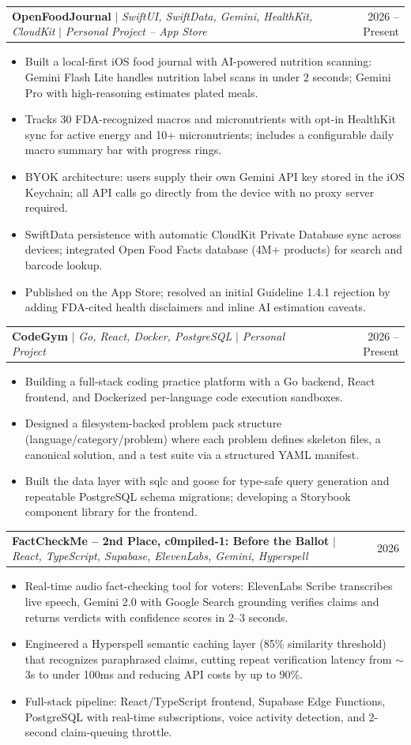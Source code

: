 \documentclass[letterpaper,11pt]{article}
\makeatletter
\newcommand{\resumeItem}[1]{
  \item\small{
    {#1 \vspace{-2pt}}
  }
}
\newcommand{\resumeProjectHeading}[2]{
    \item
    \begin{tabular*}{0.97\textwidth}{l@{\extracolsep{\fill}}r}
      \small#1 & #2 \\
    \end{tabular*}\vspace{-7pt}
}
\newcommand{\resumeItemListStart}{\begin{itemize}}
\newcommand{\resumeItemListEnd}{\end{itemize}\vspace{-5pt}}
\makeatother
\begin{document}
    \resumeProjectHeading
        {\textbf{OpenFoodJournal} $|$ \emph{SwiftUI, SwiftData, Gemini, HealthKit, CloudKit} $|$ \emph{Personal Project -- App Store}}{2026 -- Present}
        \resumeItemListStart
            \resumeItem{Built a local-first iOS food journal with AI-powered nutrition scanning: Gemini Flash Lite handles nutrition label scans in under 2 seconds; Gemini Pro with high-reasoning estimates plated meals.}
            \resumeItem{Tracks 30 FDA-recognized macros and micronutrients with opt-in HealthKit sync for active energy and 10+ micronutrients; includes a configurable daily macro summary bar with progress rings.}
            \resumeItem{BYOK architecture: users supply their own Gemini API key stored in the iOS Keychain; all API calls go directly from the device with no proxy server required.}
            \resumeItem{SwiftData persistence with automatic CloudKit Private Database sync across devices; integrated Open Food Facts database (4M+ products) for search and barcode lookup.}
            \resumeItem{Published on the App Store; resolved an initial Guideline 1.4.1 rejection by adding FDA-cited health disclaimers and inline AI estimation caveats.}
        \resumeItemListEnd

    \resumeProjectHeading
        {\textbf{CodeGym} $|$ \emph{Go, React, Docker, PostgreSQL} $|$ \emph{Personal Project}}{2026 -- Present}
        \resumeItemListStart
            \resumeItem{Building a full-stack coding practice platform with a Go backend, React frontend, and Dockerized per-language code execution sandboxes.}
            \resumeItem{Designed a filesystem-backed problem pack structure (language/category/problem) where each problem defines skeleton files, a canonical solution, and a test suite via a structured YAML manifest.}
            \resumeItem{Built the data layer with sqlc and goose for type-safe query generation and repeatable PostgreSQL schema migrations; developing a Storybook component library for the frontend.}
        \resumeItemListEnd

    \resumeProjectHeading
        {\textbf{FactCheckMe -- 2nd Place, c0mpiled-1: Before the Ballot} $|$ \emph{React, TypeScript, Supabase, ElevenLabs, Gemini, Hyperspell}}{2026}
        \resumeItemListStart
            \resumeItem{Real-time audio fact-checking tool for voters: ElevenLabs Scribe transcribes live speech, Gemini 2.0 with Google Search grounding verifies claims and returns verdicts with confidence scores in 2--3 seconds.}
            \resumeItem{Engineered a Hyperspell semantic caching layer (85\% similarity threshold) that recognizes paraphrased claims, cutting repeat verification latency from $\sim$3s to under 100ms and reducing API costs by up to 90\%.}
            \resumeItem{Full-stack pipeline: React/TypeScript frontend, Supabase Edge Functions, PostgreSQL with real-time subscriptions, voice activity detection, and 2-second claim-queuing throttle.}
        \resumeItemListEnd
\end{document}
